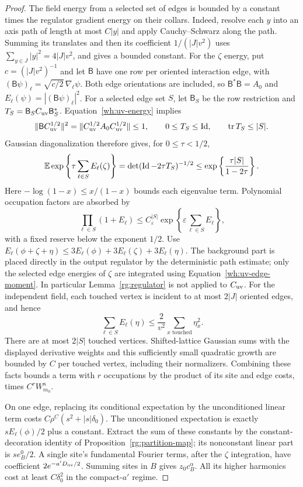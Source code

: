 \begin{proof}
The field energy from a selected set of edges is bounded by a constant
times the regulator gradient energy on their collars.  Indeed, resolve
each $y$ into an axis path of length at most $C|y|$ and apply
Cauchy--Schwarz along the path.  Summing its translates and then its
coefficient $1/(|J|v^2)$ uses
$\sum_{y\in J}|y|^2=4|J|v^2$, and gives a bounded constant.
For the $\zeta$ energy, put $c=(|J|v^2)^{-1}$ and let $\mathsf{B}$ have
one row per oriented interaction edge, with
$(\mathsf{B}\psi)_\ell=\sqrt{c/2}\,\nabla_\ell\psi$.  Both edge orientations
are included, so $\mathsf{B}^*\mathsf{B}=A_0$ and
$E_\ell(\psi)=|(\mathsf{B}\psi)_\ell|^2$.
For a selected edge set $S$, let $\mathsf{B}_S$ be the row restriction and
$T_S=\mathsf{B}_SC_{\rm uv}\mathsf{B}_S^*$.
Equation~\eqref{wh:uv-energy} implies
\[
 \|\mathsf{B}C_{\rm uv}^{1/2}\|^2
 =\|C_{\rm uv}^{1/2}A_0C_{\rm uv}^{1/2}\|\le1,
 \qquad 0\le T_S\le\operatorname{Id},\qquad \operatorname{tr} T_S\le|S|.
\]
Gaussian diagonalization therefore gives, for $0\le\tau<1/2$,
\begin{equation}\label{wh:uv-edge-moment}
 \mathbb E\exp\left\{\tau\sum_{\ell\in S}E_\ell(\zeta)\right\}
 =\det(\operatorname{Id}-2\tau T_S)^{-1/2}
 \le\exp\left\{\frac{\tau|S|}{1-2\tau}\right\}.
\end{equation}
Here $-\log(1-x)\le x/(1-x)$ bounds each eigenvalue term.
Polynomial occupation factors are absorbed by
\[
 \prod_{\ell\in S}(1+E_\ell)
 \le C_\varepsilon^{|S|}
                  \exp\left\{\varepsilon\sum_{\ell\in S}E_\ell\right\},
\]
with a fixed reserve below the exponent $1/2$.
Use
$E_\ell(\phi+\zeta+\eta)
 \le3E_\ell(\phi)+3E_\ell(\zeta)+3E_\ell(\eta)$.
The background part is placed directly in the output regulator
by the deterministic path estimate; only the selected edge energies
of $\zeta$ are integrated using Equation~\eqref{wh:uv-edge-moment}.
In particular Lemma~\ref{rg:regulator} is not applied to $C_{\rm uv}$.
For the independent field, each touched vertex is incident to at
most $2|J|$ oriented edges, and hence
\[
 \sum_{\ell\in S}E_\ell(\eta)
 \le\frac2{v^2}\sum_{x\text{ touched}}\eta_x^2.
\]
There are at most $2|S|$ touched vertices.
Shifted-lattice Gaussian sums with the displayed derivative weights
and this sufficiently small quadratic growth are bounded by $C$ per
touched vertex, including their normalizers.  Combining these facts
bounds a term with $r$ occupations by the product of its site and edge
costs, times $C^rW_{m_0}^\kappa$.

On one edge, replacing its conditional expectation by the unconditioned
linear term costs $C\rho^C(s^2+|s|\delta_0)$.  The unconditioned
expectation is exactly $sE_\ell(\phi)/2$ plus a constant.  Extract the
sum of these constants by the constant-decoration identity of
Proposition~\ref{rg:partition-map}; its nonconstant linear part is
$s e_B^0/2$.  A single site's fundamental Fourier terms, after the
$\zeta$ integration, have coefficient $2e^{-a'D_{\rm uv}/2}$.
Summing sites in $B$ gives $z_0c_B^\alpha$.  All its higher harmonics
cost at least $C\delta_0^2$ in the compact-$a'$ regime.


\end{proof}
